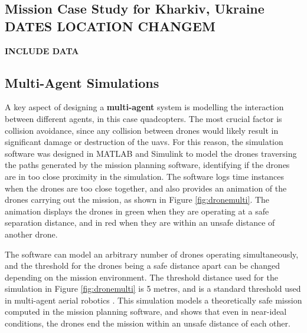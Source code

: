 \newpage

\subsection{Mission Case Study for Kharkiv, Ukraine DATES LOCATION CHANGEM}

\textbf{INCLUDE DATA}
\subsection{Multi-Agent Simulations}

A key aspect of designing a \textbf{multi-agent} system is modelling the interaction between different agents, in this case quadcopters. The most crucial factor is collision avoidance, since any collision between drones would likely result in significant damage or destruction of the \gls{uav}s. For this reason, the simulation software was designed in MATLAB and Simulink to model the drones traversing the paths generated by the mission planning software, identifying if the drones are in too close proximity in the simulation. The software logs time instances when the drones are too close together, and also provides an animation of the drones carrying out the mission, as shown in Figure \ref{fig:dronemulti}. The animation displays the drones in green when they are operating at a safe separation distance, and in red when they are within an unsafe distance of another drone. 

The software can model an arbitrary number of drones operating simultaneously, and the threshold for the drones being a safe distance apart can be changed depending on the mission environment. The threshold distance used for the simulation in Figure \ref{fig:dronemulti} is 5 metres, and is a standard threshold used in multi-agent aerial robotics \cite{crannverdon}. This simulation models a theoretically safe mission computed in the mission planning software, and shows that even in near-ideal conditions, the drones end the mission within an unsafe distance of each other. 
 
